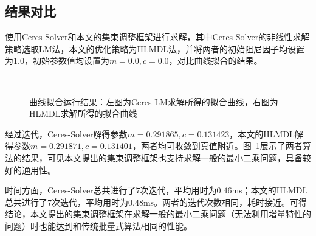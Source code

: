\subsection{结果对比}

使用Ceres-Solver和本文的集束调整框架进行求解，其中Ceres-Solver的非线性求解策略选取LM法，本文的优化策略为HLMDL法，并将两者的初始阻尼因子均设置为$1.0$，初始参数值均设置为$m=0.0,c=0.0$，对比曲线拟合的结果。

\begin{figure}[htb!]
    \centering
    ~
    \caption{曲线拟合运行结果：左图为Ceres-LM求解所得的拟合曲线，右图为HLMDL求解所得的拟合曲线}
    \label{fig:curve}
\end{figure}

经过迭代，Ceres-Solver解得参数$m=0.291865,c=0.131423$，本文的HLMDL解得参数$m=0.291871,c=0.131401$，两者均可收敛到真值附近。图~\ref{fig:curve}展示了两者算法的结果，可见本文提出的集束调整框架也支持求解一般的最小二乘问题，具备较好的通用性。

时间方面，Ceres-Solver总共进行了$7$次迭代，平均用时为$0.46$ms；本文的HLMDL总共进行了$7$次迭代，平均用时为$0.48$ms。两者的迭代次数相同，耗时接近。可得结论，本文提出的集束调整框架在求解一般的最小二乘问题（无法利用增量特性的问题）时也能达到和传统批量式算法相同的性能。

